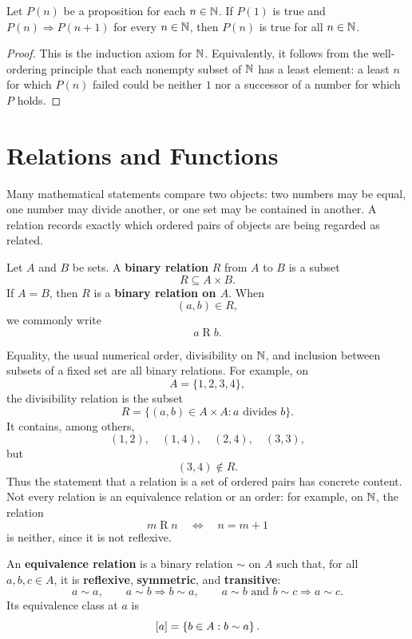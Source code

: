 \begin{theorem}[Induction]
\label{thm:induction}
Let $P(n)$ be a proposition for each $n\in\mathbb{N}$. If $P(1)$ is true and $P(n)\Rightarrow P(n+1)$ for every $n\in\mathbb{N}$, then $P(n)$ is true for all $n\in\mathbb{N}$.
\end{theorem}
\begin{proof}
This is the induction axiom for $\mathbb{N}$. Equivalently, it follows from the well-ordering principle that each nonempty subset of $\mathbb{N}$ has a least element: a least $n$ for which $P(n)$ failed could be neither $1$ nor a successor of a number for which $P$ holds.
\end{proof}

\section{Relations and Functions}

Many mathematical statements compare two objects: two numbers may be equal,
one number may divide another, or one set may be contained in another. A
relation records exactly which ordered pairs of objects are being regarded as
related.

\begin{definition}
Let $A$ and $B$ be sets. A \textbf{binary relation} $R$ from $A$ to $B$ is a
subset
\[
R\subseteq A\times B.
\]
If $A=B$, then $R$ is a \textbf{binary relation on $A$}. When
\[
(a,b)\in R,
\]
we commonly write
\[
a\mathrel{R}b.
\]
\end{definition}

\begin{example}
Equality, the usual numerical order, divisibility on \(\mathbb{N}\), and inclusion
between subsets of a fixed set are all binary relations. For example, on
\[
A=\{1,2,3,4\},
\]
the divisibility relation is the subset
\[
R=\{(a,b)\in A\times A:a\text{ divides }b\}.
\]
It contains, among others,
\[
(1,2),\quad (1,4),\quad (2,4),\quad (3,3),
\]
but
\[
(3,4)\notin R.
\]
Thus the statement that a relation is a set of ordered pairs has concrete
content. Not every relation is an equivalence relation or an order: for
example, on \(\mathbb{N}\), the relation
\[
m\mathrel{R}n\quad\Longleftrightarrow\quad n=m+1
\]
is neither, since it is not reflexive.
\end{example}

\begin{definition}
An \textbf{equivalence relation} is a binary relation $\sim$ on $A$ such
that, for all $a,b,c\in A$, it is \textbf{reflexive},
\textbf{symmetric}, and \textbf{transitive}:
\[
a\sim a,
\qquad
a\sim b\Longrightarrow b\sim a,
\qquad
a\sim b\text{ and }b\sim c\Longrightarrow a\sim c.
\]
Its equivalence class at $a$ is
\[
[a]=\left\{b\in A:b\sim a\right\}.
\]
\end{definition}

